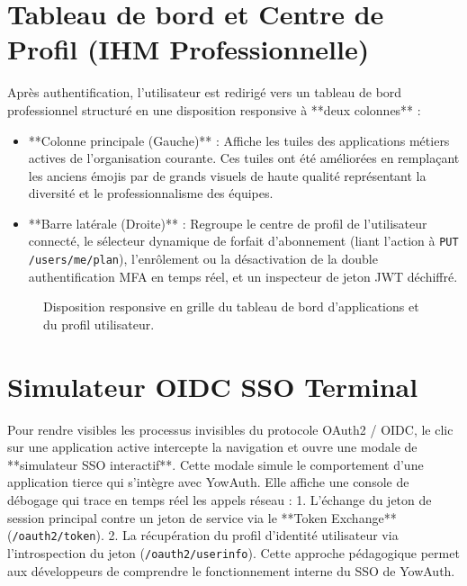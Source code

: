 \documentclass[
]{IPLeiriaThesis}
\newcommand{\code}[1]{\texttt{\small #1}}
\begin{document}
\section{Tableau de bord et Centre de Profil (IHM Professionnelle)}
Après authentification, l'utilisateur est redirigé vers un tableau de bord professionnel structuré en une disposition responsive à **deux colonnes** :
\begin{itemize}
  \item **Colonne principale (Gauche)** : Affiche les tuiles des applications métiers actives de l'organisation courante. Ces tuiles ont été améliorées en remplaçant les anciens émojis par de grands visuels de haute qualité représentant la diversité et le professionnalisme des équipes.
  \item **Barre latérale (Droite)** : Regroupe le centre de profil de l'utilisateur connecté, le sélecteur dynamique de forfait d'abonnement (liant l'action à \code{PUT /users/me/plan}), l'enrôlement ou la désactivation de la double authentification MFA en temps réel, et un inspecteur de jeton JWT déchiffré.
\end{itemize}

\begin{figure}[h]
  \centering
  \caption{Disposition responsive en grille du tableau de bord d'applications et du profil utilisateur.}
  \label{fig:poc-dashboard}
\end{figure}

\section{Simulateur OIDC SSO Terminal}
Pour rendre visibles les processus invisibles du protocole OAuth2 / OIDC, le clic sur une application active intercepte la navigation et ouvre une modale de **simulateur SSO interactif**.
Cette modale simule le comportement d'une application tierce qui s'intègre avec YowAuth. Elle affiche une console de débogage qui trace en temps réel les appels réseau :
1. L'échange du jeton de session principal contre un jeton de service via le **Token Exchange** (\code{/oauth2/token}).
2. La récupération du profil d'identité utilisateur via l'introspection du jeton (\code{/oauth2/userinfo}).
Cette approche pédagogique permet aux développeurs de comprendre le fonctionnement interne du SSO de YowAuth.
\end{document}
